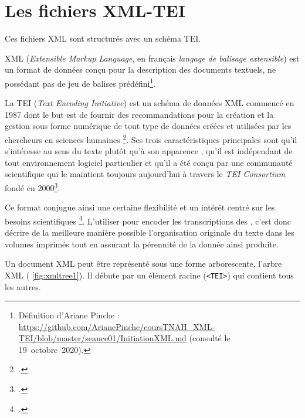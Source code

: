 \section{Les fichiers XML-TEI}

Ces fichiers XML sont structurés avec un schéma TEI.

XML (\textit{Extensible Markup Language}, en français \textit{langage de balisage extensible}) est un format de données conçu pour la description des documents textuels, ne possédant pas de jeu de balises prédéfini\footnote{Définition d'Ariane Pinche : \url{https://github.com/ArianePinche/coursTNAH_XML-TEI/blob/master/seance01/InitiationXML.md} (consulté le 19~octobre~2020).}.

La TEI (\textit{Text Encoding Initiative}) est un schéma de données XML commencé en 1987 dont le but est de \og fournir des recommandations pour la création et la gestion sous forme numérique de tout type de données créées et utilisées par les chercheurs en sciences humaines \fg\footcite[p. 9]{burnard}. Ses trois caractéristiques principales sont qu'il \og s’intéresse au sens du texte plutôt qu'à son apparence \fg, qu'il est \og indépendant de tout environnement logiciel particulier \fg{} et qu'il a été conçu par une communauté scientifique qui le maintient toujours aujourd'hui à travers le \textit{TEI Consortium} fondé en 2000\footcite[p. 9]{burnard}. 

Ce format conjugue ainsi une certaine \og flexibilité et un intérêt centré sur les besoins scientifiques \fg\footcite[p. 10]{burnard}. L'utiliser pour encoder les transcriptions des \odm, c'est donc décrire de la meilleure manière possible l'organisation originale du texte dans les volumes imprimés tout en assurant la pérennité de la donnée ainsi produite.

Un document XML peut être représenté sous une forme arborescente, \og l'arbre XML \fg{} (\fig{} \ref{fig:xmltree1}). Il débute par un élément racine (\texttt{<TEI>}) qui contient tous les autres.

